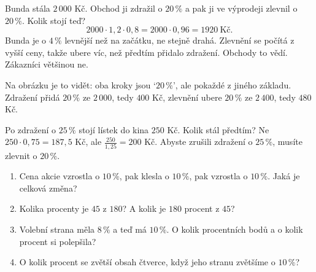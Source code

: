 \begin{example}
  Bunda stála $2\,000$ Kč. Obchod ji zdražil o $20\,\%$ a pak ji ve výprodeji zlevnil o $20\,\%$. Kolik stojí teď?
  \begin{equation*}
    2000\cdot 1{,}2\cdot 0{,}8 = 2000\cdot 0{,}96 = 1920\ \text{Kč}.
  \end{equation*}
  Bunda je o $4\,\%$ levnější než na začátku, ne stejně drahá. Zlevnění se počítá z vyšší ceny, takže ubere víc, než předtím přidalo zdražení. Obchody to vědí. Zákazníci většinou ne.
  \begin{center}
  \end{center}
  Na obrázku je to vidět: oba kroky jsou `$20\,\%$', ale pokaždé z jiného základu. Zdražení přidá $20\,\%$ ze $2\,000$, tedy $400$ Kč, zlevnění ubere $20\,\%$ ze $2\,400$, tedy $480$ Kč.
\end{example}

\begin{example}
  Po zdražení o $25\,\%$ stojí lístek do kina $250$ Kč. Kolik stál předtím? Ne $250\cdot 0{,}75 = 187{,}5$ Kč, ale $\frac{250}{1{,}25} = 200$ Kč. Abyste zrušili zdražení o $25\,\%$, musíte zlevnit o $20\,\%$.
\end{example}

\begin{problem}
  \begin{enumerate}[label=(\alph*)]
    \item Cena akcie vzrostla o $10\,\%$, pak klesla o $10\,\%$, pak vzrostla o $10\,\%$. Jaká je celková změna?
    \item Kolika procenty je $45$ z $180$? A kolik je $180$ procent z $45$?
    \item Volební strana měla $8\,\%$ a teď má $10\,\%$. O kolik procentních bodů a o kolik procent si polepšila?
    \item O kolik procent se zvětší obsah čtverce, když jeho stranu zvětšíme o $10\,\%$?
  \end{enumerate}
\end{problem}

